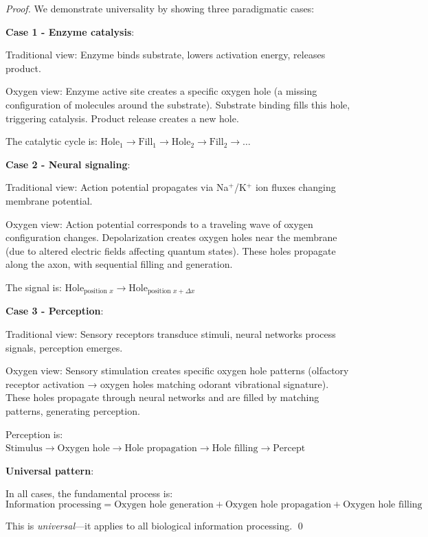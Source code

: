 \documentclass[12pt,a4paper]{article}
\begin{document}
\begin{proof}
We demonstrate universality by showing three paradigmatic cases:

\textbf{Case 1 - Enzyme catalysis}:

Traditional view: Enzyme binds substrate, lowers activation energy, releases product.

Oxygen view: Enzyme active site creates a specific oxygen hole (a missing configuration of  molecules around the substrate). Substrate binding fills this hole, triggering catalysis. Product release creates a new hole.

The catalytic cycle is: $\text{Hole}_1 \to \text{Fill}_1 \to \text{Hole}_2 \to \text{Fill}_2 \to \ldots$

\textbf{Case 2 - Neural signaling}:

Traditional view: Action potential propagates via Na$^+$/K$^+$ ion fluxes changing membrane potential.

Oxygen view: Action potential corresponds to a traveling wave of oxygen configuration changes. Depolarization creates oxygen holes near the membrane (due to altered electric fields affecting  quantum states). These holes propagate along the axon, with sequential filling and generation.

The signal is: $\text{Hole}_{\text{position } x} \to \text{Hole}_{\text{position } x + \Delta x}$

\textbf{Case 3 - Perception}:

Traditional view: Sensory receptors transduce stimuli, neural networks process signals, perception emerges.

Oxygen view: Sensory stimulation creates specific oxygen hole patterns (olfactory receptor activation → oxygen holes matching odorant vibrational signature). These holes propagate through neural networks and are filled by matching patterns, generating perception.

Perception is: $\text{Stimulus} \to \text{Oxygen hole} \to \text{Hole propagation} \to \text{Hole filling} \to \text{Percept}$

\textbf{Universal pattern}:

In all cases, the fundamental process is:
\begin{equation}
\text{Information processing} = \text{Oxygen hole generation} + \text{Oxygen hole propagation} + \text{Oxygen hole filling}
\end{equation}

This is \textit{universal}—it applies to all biological information processing. \qed
\end{proof}
\end{document}
